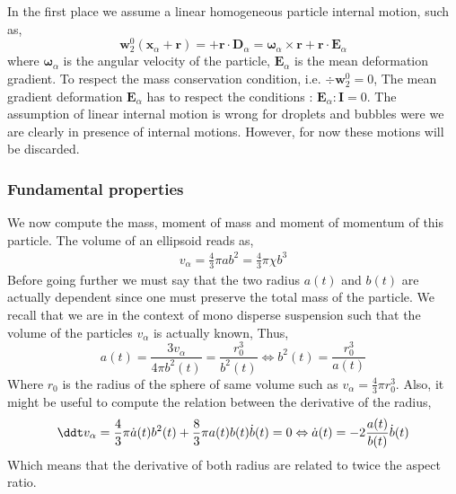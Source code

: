 In the first place we assume a linear homogeneous particle internal motion, such as, 
\begin{equation}
    \textbf{w}_2^0(\textbf{x}_\alpha+ \textbf{r})
    = 
    + \textbf{r} \cdot \textbf{D}_\alpha
    = 
    \bm{\omega}_\alpha \times \textbf{r} 
    + \textbf{r} \cdot \textbf{E}_\alpha
\end{equation}
where $\bm{\omega}_\alpha$ is the angular velocity of the particle, $\textbf{E}_\alpha$ is the mean deformation gradient. 
To respect the mass conservation condition, i.e. $\div \textbf{w}_2^0 =0$, The mean gradient deformation $\textbf{E}_\alpha$ has to respect the conditions : $\textbf{E}_\alpha:\textbf{I}=0$. 
The assumption of linear internal motion is wrong for droplets and bubbles were we are clearly in presence of internal motions. 
However, for now these motions will be discarded. 

\subsubsection{Fundamental properties}

We now compute the mass, moment of mass and moment of momentum of this particle. 
The volume of an ellipsoid reads as, 
\begin{align}
    v_\alpha
    = \frac{4}{3}\pi a b^2
    = \frac{4}{3}\pi \chi  b^3
    \label{eq:volume_def}
\end{align}
Before going further we must say that the two radius $a(t)$ and $b(t)$ are actually dependent since one must preserve the total mass of the particle. 
We recall that we are in the context of mono disperse suspension such that the volume of the particles $v_\alpha$ is actually known, Thus, 
\begin{equation*}
    a(t) 
    = \frac{3 v_\alpha}{4 \pi b^2(t)}
    = \frac{r_0^3}{ b^2(t)}
    \Leftrightarrow
    b^2(t) 
    = \frac{r_0^3}{ a(t)}
\end{equation*}
Where $r_0$ is the radius of the sphere of same volume such as $v_\alpha = \frac{4}{3}\pi r_0^3$. 
Also, it might be useful to compute the relation between the derivative of the radius,  
\begin{equation*}
    \ddt v_\alpha 
    = \frac{4}{3}\pi \dot{a}(t) b^2(t)
    + \frac{8}{3} \pi {a}(t) b(t) \dot{b}(t)
    = 0 
    \Leftrightarrow
     \dot{a}(t)
    =  
    - 2 \frac{a(t)}{b(t)}  \dot{b}(t)
\end{equation*}
Which means that the derivative of both radius are related to twice the aspect ratio. 

